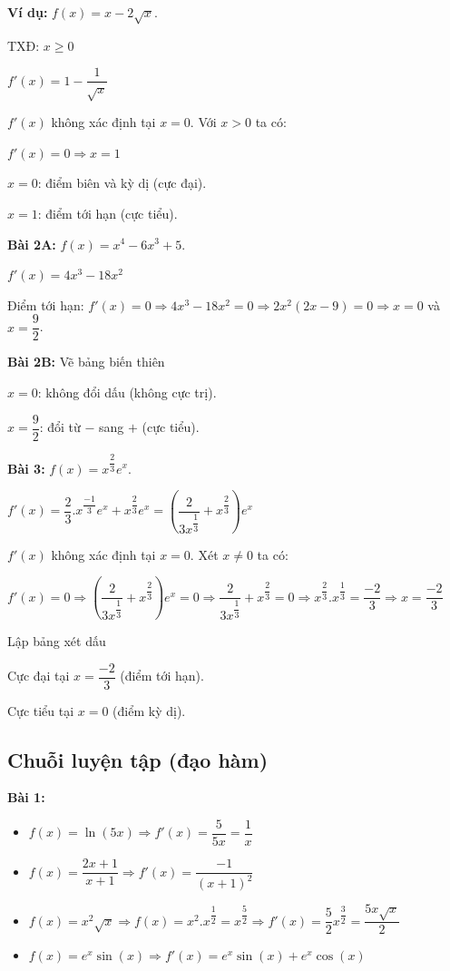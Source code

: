 \documentclass[12pt,a4paper]{article}
\begin{document}
\textbf{Ví dụ:} $f(x) = x-2\sqrt{x}$.

TXĐ: $x \ge 0$

$f'(x) = 1 - \dfrac{1}{\sqrt{x}}$

$f'(x)$ không xác định tại $x = 0$. Với $x > 0$ ta có:

$f'(x) = 0 \Rightarrow x = 1$

$x=0$: điểm biên và kỳ dị (cực đại).

$x=1$: điểm tới hạn (cực tiểu).

\textbf{Bài 2A:} $f(x) = x^4-6x^3+5$. 

$f'(x) = 4x^3-18x^2$

Điểm tới hạn: $f'(x) = 0 \Rightarrow 4x^3-18x^2 = 0 \Rightarrow 2x^2(2x - 9) = 0 \Rightarrow x=0$ và $x=\dfrac{9}{2}$.

\textbf{Bài 2B:} Vẽ bảng biến thiên

$x=0$: không đổi dấu (không cực trị). 

$x=\dfrac{9}{2}$: đổi từ $-$ sang $+$ (cực tiểu).

\textbf{Bài 3:} $f(x) = x^{\dfrac{2}{3}}e^x$.

$f'(x) = \dfrac{2}{3}.x^{\dfrac{-1}{3}}e^x + x^{\dfrac{2}{3}}e^x = (\dfrac{2}{3x^{\dfrac{1}{3}}} + x^{\dfrac{2}{3}})e^x$

$f'(x)$ không xác định tại $x = 0$. Xét $x \ne 0$ ta có:

$f'(x) = 0 \Rightarrow (\dfrac{2}{3x^{\dfrac{1}{3}}} + x^{\dfrac{2}{3}})e^x = 0 \Rightarrow \dfrac{2}{3x^{\dfrac{1}{3}}} + x^{\dfrac{2}{3}} = 0 \Rightarrow x^{\dfrac{2}{3}}.x^{\dfrac{1}{3}} = \dfrac{-2}{3} \Rightarrow x = \dfrac{-2}{3}$

Lập bảng xét dấu

Cực đại tại $x=\dfrac{-2}{3}$ (điểm tới hạn). 

Cực tiểu tại $x=0$ (điểm kỳ dị).

\subsection{Chuỗi luyện tập (đạo hàm)}

\textbf{Bài 1:}
\begin{itemize}
\item $f(x) = \ln(5x) \Rightarrow f'(x) = \dfrac{5}{5x} = \dfrac{1}{x}$
\item $f(x) = \dfrac{2x+1}{x+1} \Rightarrow f'(x) = \dfrac{-1}{(x+1)^2}$
\item $f(x) = x^2\sqrt{x} \Rightarrow f(x) = x^2.x^{\dfrac{1}{2}} = x^{\dfrac{5}{2}} \Rightarrow f'(x) = \dfrac{5}{2}x^{\dfrac{3}{2}} = \dfrac{5x\sqrt{x}}{2}$
\item $f(x) = e^x\sin(x) \Rightarrow f'(x) = e^x\sin(x)+e^x\cos(x)$
\end{itemize}
\end{document}
